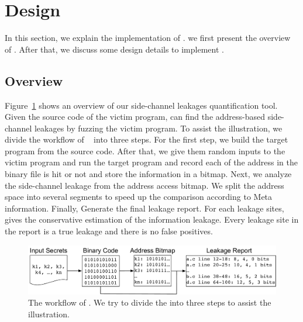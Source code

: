 \section{Design}
In this section, we explain the implementation of \tool{}.
we first present the overview of \tool{}. After that, we discuss some design details to implement \tool{}.

\subsection{Overview}
Figure~\ref{fig:workflow} shows an overview of our side-channel leakages quantification tool. Given the source code of the victim program, \tool{} can find the address-based side-channel leakages by fuzzing the victim program. To assist the illustration, we divide the workflow of ~\tool{} into three steps. For the first step, we build the target program from the source code. After that, we give them random inputs to the victim program and run the target program and record each of the address in the binary file is hit or not and store the information in a bitmap. Next, we analyze the side-channel leakage from the address access bitmap. We split the address space into several segments to speed up the comparison according to Meta information. Finally, \tool{} Generate the final leakage report. For each leakage sites, \tool{} gives the conservative estimation of the information leakage. Every leakage site in the report is a true leakage and there is no false positives.

\begin{figure}[ht]
  \centering
  \includegraphics[width=\columnwidth]{./figures/chapter5/workflow.pdf}
  \caption{The workflow of \tool{}. We try to divide the \tool{} into three steps to assist the illustration. }\label{fig:workflow}
\end{figure}

